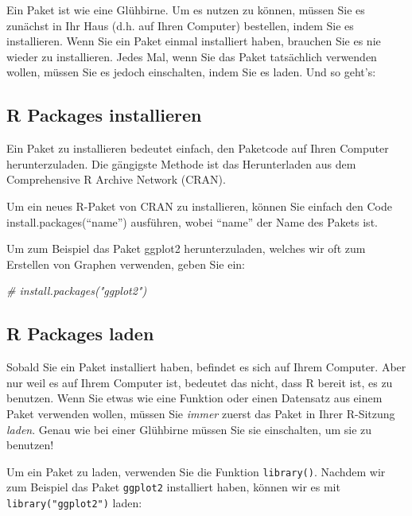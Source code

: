 \documentclass[
]{book}
\newenvironment{Shaded}{\begin{snugshade}}{\end{snugshade}}
\newcommand{\CommentTok}[1]{\textcolor[rgb]{0.56,0.35,0.01}{\textit{#1}}}
\begin{document}
Ein Paket ist wie eine Glühbirne. Um es nutzen zu können, müssen Sie es zunächst in Ihr Haus (d.h. auf Ihren Computer) bestellen, indem Sie es installieren. Wenn Sie ein Paket einmal installiert haben, brauchen Sie es nie wieder zu installieren. Jedes Mal, wenn Sie das Paket tatsächlich verwenden wollen, müssen Sie es jedoch einschalten, indem Sie es laden. Und so geht's:

\hypertarget{r-packages-installieren}{%
\subsection{R Packages installieren}\label{r-packages-installieren}}

Ein Paket zu installieren bedeutet einfach, den Paketcode auf Ihren Computer herunterzuladen. Die gängigste Methode ist das Herunterladen aus dem Comprehensive R Archive Network (CRAN).

Um ein neues R-Paket von CRAN zu installieren, können Sie einfach den Code install.packages(``name'') ausführen, wobei ``name'' der Name des Pakets ist.

Um zum Beispiel das Paket ggplot2 herunterzuladen, welches wir oft zum Erstellen von Graphen verwenden, geben Sie ein:

\begin{Shaded}
\begin{Highlighting}[]
\CommentTok{\# install.packages("ggplot2")}
\end{Highlighting}
\end{Shaded}

\hypertarget{r-packages-laden}{%
\subsection{R Packages laden}\label{r-packages-laden}}

Sobald Sie ein Paket installiert haben, befindet es sich auf Ihrem Computer. Aber nur weil es auf Ihrem Computer ist, bedeutet das nicht, dass R bereit ist, es zu benutzen. Wenn Sie etwas wie eine Funktion oder einen Datensatz aus einem Paket verwenden wollen, müssen Sie \emph{immer} zuerst das Paket in Ihrer R-Sitzung \emph{laden}. Genau wie bei einer Glühbirne müssen Sie sie einschalten, um sie zu benutzen!

Um ein Paket zu laden, verwenden Sie die Funktion \texttt{library()}. Nachdem wir zum Beispiel das Paket \texttt{ggplot2} installiert haben, können wir es mit \texttt{library("ggplot2")} laden:
\end{document}
